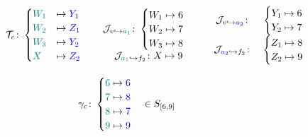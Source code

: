 \documentclass{amsart}
\begin{document}
\begin{figure}[h]
\begin{subfigure}{\textwidth}
\end{subfigure}
\begin{subfigure}{\textwidth}
\begin{equation*}
\mathcal{T}_c\colon\begin{cases}{\color{teal}W_1}&\mapsto{\color{blue}Y_1}\\{\color{teal}W_2}&\mapsto{\color{blue}Z_1}\\{\color{teal}W_3}&\mapsto{\color{blue}Y_2}\\{\color{teal}X}&\mapsto{\color{blue}Z_2}\end{cases}\qquad
\begin{matrix}\mathcal{J}_{v\hookrightarrow{\color{teal}a_1}}\colon\begin{cases}W_1\mapsto6\\W_2\mapsto7\\W_3\mapsto8\end{cases}\\\mathcal{J}_{{\color{teal}a_1}\hookrightarrow f_2}\colon X\mapsto9\end{matrix}\qquad
\begin{matrix}\mathcal{J}_{v\hookrightarrow{\color{blue}a_2}}\colon&\begin{cases}Y_1\mapsto6\\Y_2\mapsto7\end{cases}\\\mathcal{J}_{{\color{blue}a_2}\hookrightarrow f_2}\colon&\begin{cases}Z_1\mapsto8\\Z_2\mapsto9\end{cases}\end{matrix}
\end{equation*}
\begin{minipage}{.4\textwidth}
\begin{equation*}
\gamma_c\colon\begin{cases}{\color{teal}6}\mapsto{\color{blue}6}\\{\color{teal}7}\mapsto{\color{blue}8}\\{\color{teal}8}\mapsto{\color{blue}7}\\{\color{teal}9}\mapsto{\color{blue}9}\end{cases}\in S_{[6,9]}
\end{equation*}
\end{minipage}\begin{minipage}{.6\textwidth}
\centering
{}
\end{minipage}
\end{subfigure}
\end{figure}
\end{document}
